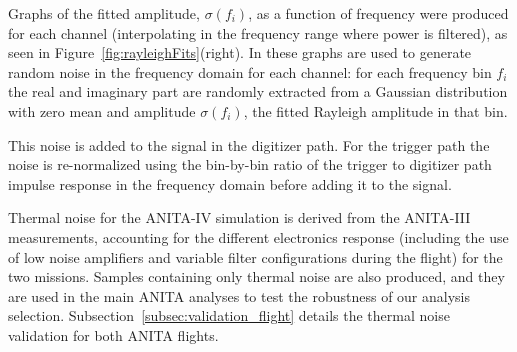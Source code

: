 Graphs of the fitted amplitude, $\sigma(f_i)$, as a function of
frequency were produced for each channel (interpolating in the frequency range where power is filtered), as seen in Figure~\ref{fig:rayleighFits}(right).
In \icemc these graphs are used to generate random noise in the
frequency domain for each channel: for each frequency bin $f_i$ the real and imaginary part are randomly extracted from a Gaussian distribution with zero mean and amplitude
$\sigma(f_i)$, the fitted Rayleigh amplitude in that bin.

This noise is added to the signal in the digitizer path.
For the trigger path the noise is re-normalized using the bin-by-bin ratio of the
trigger to digitizer path impulse response in the frequency domain
before adding it to the signal.

Thermal noise for the ANITA-IV simulation is derived from the ANITA-III measurements, accounting for the different electronics response (including the use of low noise amplifiers and variable filter configurations during the flight) for the two missions.
Samples containing only thermal noise are also produced, and they are used in
the main ANITA analyses to test the robustness of our analysis selection.
Subsection~\ref{subsec:validation_flight} details the thermal noise validation for both ANITA flights.


